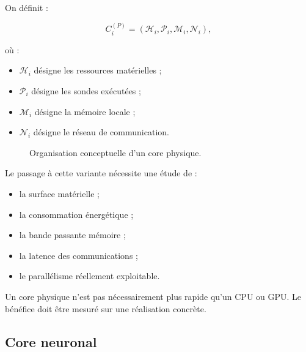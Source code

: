 \documentclass[11pt,a4paper]{article}
\begin{document}
On définit :

\[
C_i^{(P)}
=
(\mathcal{H}_i,\mathcal{P}_i,\mathcal{M}_i,\mathcal{N}_i),
\]

où :
\begin{itemize}
  \item $\mathcal{H}_i$ désigne les ressources matérielles ;
  \item $\mathcal{P}_i$ désigne les sondes exécutées ;
  \item $\mathcal{M}_i$ désigne la mémoire locale ;
  \item $\mathcal{N}_i$ désigne le réseau de communication.
\end{itemize}

\begin{figure}[H]
\centering
{}
\caption{Organisation conceptuelle d'un core physique.}
\end{figure}

Le passage à cette variante nécessite une étude de :
\begin{itemize}
  \item la surface matérielle ;
  \item la consommation énergétique ;
  \item la bande passante mémoire ;
  \item la latence des communications ;
  \item le parallélisme réellement exploitable.
\end{itemize}

Un core physique n'est pas nécessairement plus rapide qu'un CPU ou GPU.
Le bénéfice doit être mesuré sur une réalisation concrète.

\subsection{Core neuronal}
\end{document}
